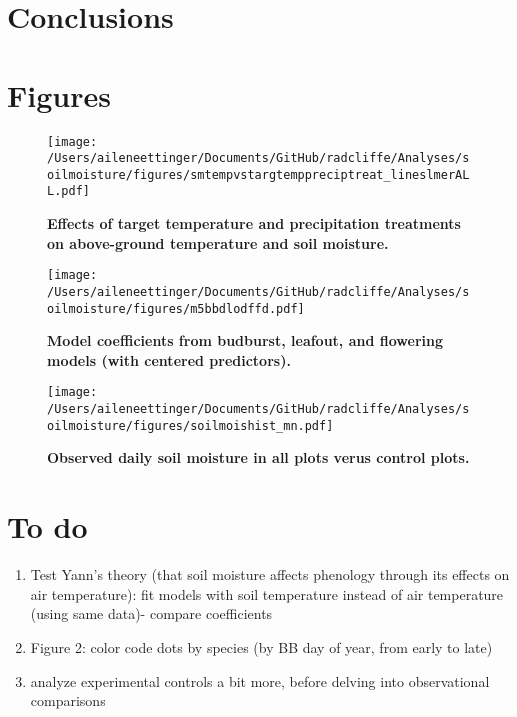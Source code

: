 \documentclass{article}
\begin{document}
\section* {Conclusions}



\clearpage
\section* {Figures}
\clearpage
 \begin{figure}[h]
\centering
 \texttt{[image: /Users/aileneettinger/Documents/GitHub/radcliffe/Analyses/soilmoisture/figures/smtempvstargtemppreciptreat\_lineslmerALL.pdf]}
 \caption{\textbf{Effects of target temperature and precipitation treatments on above-ground temperature and soil moisture.}} 
 \label{fig:soilmois}
 \end{figure}

\begin{figure}[h]
\centering
 \texttt{[image: /Users/aileneettinger/Documents/GitHub/radcliffe/Analyses/soilmoisture/figures/m5bbdlodffd.pdf]}
 \caption{\textbf{Model coefficients from budburst, leafout, and flowering models (with centered predictors).}} 
 \label{fig:bb}
 \end{figure}

\begin{figure}[h]
\centering
 \texttt{[image: /Users/aileneettinger/Documents/GitHub/radcliffe/Analyses/soilmoisture/figures/soilmoishist\_mn.pdf]}
 \caption{\textbf{Observed daily soil moisture in all plots verus control plots.}} 
 \label{fig:sm}
 \end{figure}


\section* {To do}
\begin{enumerate}
\item Test Yann's theory (that soil moisture affects phenology through its effects on air temperature): fit models with soil temperature instead of air temperature (using same data)- compare coefficients

\item Figure 2: color code dots by species (by BB day of year, from early to late)
\item analyze experimental controls a bit more, before delving into observational comparisons
\end{enumerate}
\end{document}
